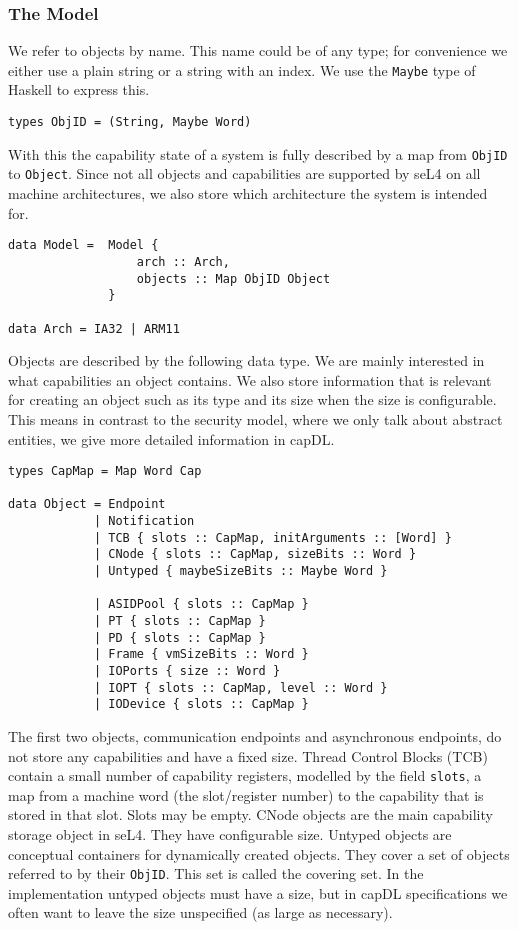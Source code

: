 \documentclass[a4paper,12pt]{article}
\begin{document}
\subsubsection{The Model}
We refer to objects by name. This name could be of any type; for convenience we either use a plain string or a string with an index. We use the \texttt{Maybe} type of Haskell to express this. 

\begin{verbatim}
types ObjID = (String, Maybe Word)
\end{verbatim}

With this the capability state of a system is fully described by a map from \texttt{ObjID} to \texttt{Object}. Since not all objects and capabilities are supported by seL4 on all machine architectures, we also store which architecture the system is intended for.

\begin{verbatim}
data Model =  Model {
                  arch :: Arch,
                  objects :: Map ObjID Object
              } 

data Arch = IA32 | ARM11
\end{verbatim}

Objects are described by the following data type. We are mainly interested in what capabilities an object contains. We also store information that is relevant for creating an object such as its type and its size when the size is configurable. This means in contrast to the security model, where we only talk about abstract entities, we give more detailed information in capDL.

\begin{verbatim}
types CapMap = Map Word Cap

data Object = Endpoint
            | Notification
            | TCB { slots :: CapMap, initArguments :: [Word] }
            | CNode { slots :: CapMap, sizeBits :: Word } 
            | Untyped { maybeSizeBits :: Maybe Word }

            | ASIDPool { slots :: CapMap }
            | PT { slots :: CapMap }
            | PD { slots :: CapMap }
            | Frame { vmSizeBits :: Word }
            | IOPorts { size :: Word }
            | IOPT { slots :: CapMap, level :: Word }
            | IODevice { slots :: CapMap }
\end{verbatim}

The first two objects, communication endpoints and asynchronous endpoints, do not store any capabilities and have a fixed size. Thread Control Blocks (TCB) contain a small number of capability registers, modelled by the field \texttt{slots}, a map from a machine word (the slot/register number) to the capability that is stored in that slot. Slots may be empty. CNode objects are the main capability storage object in seL4. They have configurable size. Untyped objects are conceptual containers for dynamically created objects. They cover a set of objects referred to by their \texttt{ObjID}. This set is called the covering set. In the implementation untyped objects must have a size, but in capDL specifications we often want to leave the size unspecified (as large as necessary). 
\end{document}
